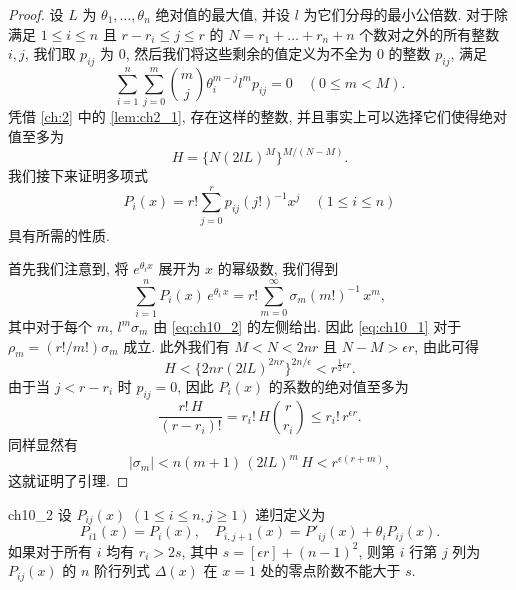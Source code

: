\begin{proof}
设 $L$ 为 $\theta_1, \ldots, \theta_n$ 绝对值的最大值, 并设 $l$ 为它们分母的最小公倍数. 对于除满足 $1 \le i \le n$ 且 $r - r_i \le j \le r$ 的 $N = r_1 + \ldots + r_n + n$ 个数对之外的所有整数 $i, j$, 我们取 $p_{ij}$ 为 0, 然后我们将这些剩余的值定义为不全为 0 的整数 $p_{ij}$, 满足
\[\sum_{i=1}^{n} \sum_{j=0}^{m} \binom{m}{j} \theta_{i}^{m-j} l^{m} p_{ij} = 0 \quad (0 \leq m < M). \tag{2}\label{eq:ch10_2}\]
凭借 \autoref{ch:2} 中的 \autoref{lem:ch2_1}, 存在这样的整数, 并且事实上可以选择它们使得绝对值至多为
\[H = \{N(2lL)^{M}\}^{M/(N-M)}.\]
我们接下来证明多项式
\[P_{i}(x) = r! \sum_{j=0}^{r} p_{ij}(j!)^{-1} x^{j} \quad (1 \leq i \leq n)\]
具有所需的性质.

首先我们注意到, 将 $e^{\theta_i x}$ 展开为 $x$ 的幂级数, 我们得到
\[\sum_{i=1}^n P_i(x)\,e^{\theta_i\,x} = r! \sum_{m=0}^\infty \sigma_m(m!)^{-1}\,x^m,\]
其中对于每个 $m$, $l^m \sigma_m$ 由 \eqref{eq:ch10_2} 的左侧给出. 因此 \eqref{eq:ch10_1} 对于 $\rho_m = (r!/m!) \sigma_m$ 成立. 此外我们有 $M < N < 2nr$ 且 $N - M > \epsilon r$, 由此可得
\[H < \{2nr(2lL)^{2nr}\}^{2n/\epsilon} < r^{\frac{1}{2}\epsilon r}.\]
由于当 $j < r - r_i$ 时 $p_{ij} = 0$, 因此 $P_i(x)$ 的系数的绝对值至多为
\[\frac{r!\,H}{(r-r_i)!} = r_i!\,H\binom{r}{r_i}\leqslant r_i!\,r^{\epsilon r}.\]
同样显然有
\[\left|\sigma_{m}\right| < n(m+1) \, (2lL)^{m} \, H < r^{\epsilon(r+m)},\]
这就证明了引理.
\end{proof}

\begin{mylemma}{}{ch10_2}
设 $P_{ij}(x)$ $(1 \le i \le n, j \ge 1)$ 递归定义为
\[P_{i1}(x) = P_{i}(x), \quad P_{i,j+1}(x) = P'_{ij}(x) + \theta_i P_{ij}(x).\]
如果对于所有 $i$ 均有 $r_i > 2s$, 其中 $s = [\epsilon r] + (n-1)^2$, 则第 $i$ 行第 $j$ 列为 $P_{ij}(x)$ 的 $n$ 阶行列式 $\Delta(x)$ 在 $x = 1$ 处的零点阶数不能大于 $s$.
\end{mylemma}

